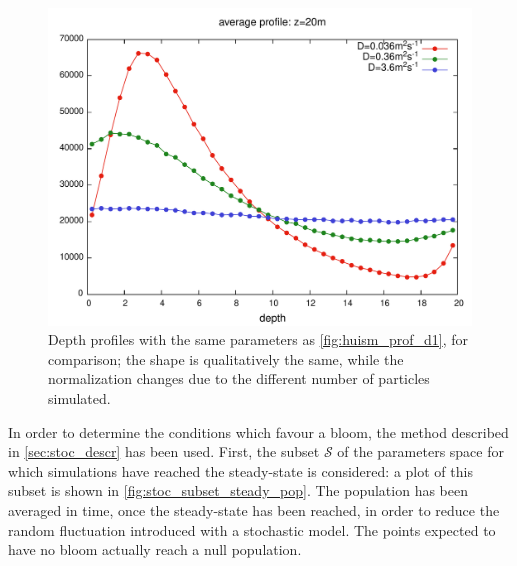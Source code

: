 \begin{figure}
    \includegraphics[width=\textwidth]{data/1D_model/reflective_bottom/profiles_z_20}
    \caption{Depth profiles with the same parameters as \autoref{fig:huism_prof_d1}, for comparison; the shape is qualitatively the same, while the normalization changes due to the different number of particles simulated.}
    \label{fig:stoc_res_profiles_z20}
\end{figure}
 

In order to determine the conditions which favour a bloom, the method described in \autoref{sec:stoc_descr} has been used. First, the subset $\mathcal{S}$ of the parameters space for which simulations have reached the steady-state is considered: a plot of this subset is shown in \autoref{fig:stoc_subset_steady_pop}. The population has been averaged in time, once the steady-state has been reached, in order to reduce the random fluctuation introduced with a stochastic model. The points expected to have no bloom actually reach a null population.

